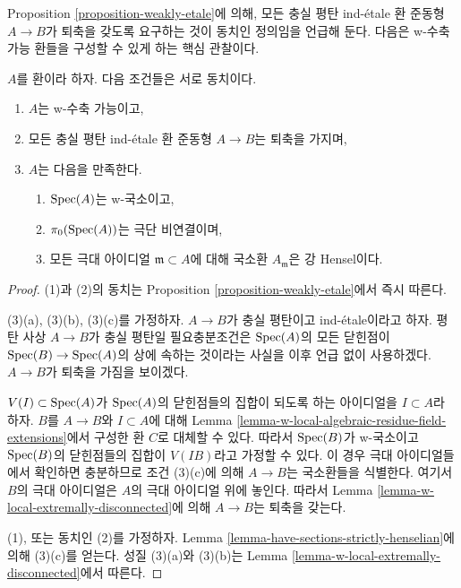 \noindent
Proposition \ref{proposition-weakly-etale}에 의해, 모든 충실 평탄
ind-\'etale 환 준동형 $A \to B$가 퇴축을 갖도록 요구하는 것이
동치인 정의임을 언급해 둔다. 다음은 w-수축 가능 환들을 구성할 수 있게
하는 핵심 관찰이다.

\begin{lemma}
\label{lemma-w-local-strictly-henselian-extremally-disconnected}
$A$를 환이라 하자. 다음 조건들은 서로 동치이다.
\begin{enumerate}
\item $A$는 w-수축 가능이고,
\item 모든 충실 평탄 ind-\'etale 환 준동형 $A \to B$는 퇴축을 가지며,
\item $A$는 다음을 만족한다.
\begin{enumerate}
\item $\mathop{\mathrm{Spec}}(A)$는 w-국소이고,
\item $\pi_0(\mathop{\mathrm{Spec}}(A))$는 극단 비연결이며,
\item 모든 극대 아이디얼 $\mathfrak m \subset A$에 대해 국소환
$A_\mathfrak m$은 강 Hensel이다.
\end{enumerate}
\end{enumerate}
\end{lemma}

\begin{proof}
(1)과 (2)의 동치는 Proposition \ref{proposition-weakly-etale}에서
즉시 따른다.

\medskip\noindent
(3)(a), (3)(b), (3)(c)를 가정하자. $A \to B$가 충실 평탄이고
ind-\'etale이라고 하자. 평탄 사상 $A \to B$가 충실 평탄일
필요충분조건은 $\mathop{\mathrm{Spec}}(A)$의 모든 닫힌점이
$\mathop{\mathrm{Spec}}(B) \to \mathop{\mathrm{Spec}}(A)$의 상에 속하는 것이라는 사실을 이후 언급 없이
사용하겠다. $A \to B$가 퇴축을 가짐을 보이겠다.

\medskip\noindent
$V(I) \subset \mathop{\mathrm{Spec}}(A)$가 $\mathop{\mathrm{Spec}}(A)$의 닫힌점들의 집합이 되도록 하는
아이디얼을 $I \subset A$라 하자. $B$를 $A \to B$와 $I \subset A$에 대해
Lemma \ref{lemma-w-local-algebraic-residue-field-extensions}에서 구성한
환 $C$로 대체할 수 있다. 따라서 $\mathop{\mathrm{Spec}}(B)$가 w-국소이고
$\mathop{\mathrm{Spec}}(B)$의 닫힌점들의 집합이 $V(IB)$라고 가정할 수 있다.
이 경우 극대 아이디얼들에서 확인하면 충분하므로 조건 (3)(c)에 의해
$A \to B$는 국소환들을 식별한다. 여기서 $B$의 극대 아이디얼은
$A$의 극대 아이디얼 위에 놓인다. 따라서 Lemma
\ref{lemma-w-local-extremally-disconnected}에 의해 $A \to B$는 퇴축을 갖는다.

\medskip\noindent
(1), 또는 동치인 (2)를 가정하자. Lemma
\ref{lemma-have-sections-strictly-henselian}에 의해 (3)(c)를 얻는다.
성질 (3)(a)와 (3)(b)는 Lemma
\ref{lemma-w-local-extremally-disconnected}에서 따른다.
\end{proof}

